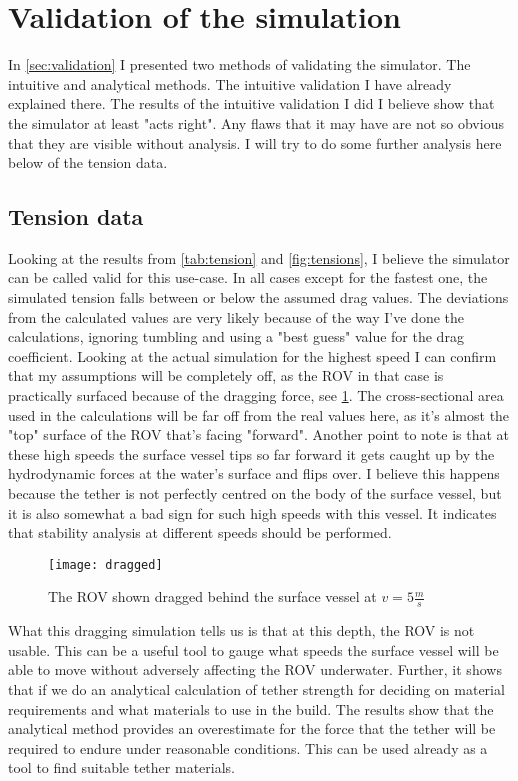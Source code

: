 \section{Validation of the simulation}
In \cref{sec:validation} I presented two methods of validating the simulator. The intuitive and analytical methods. The intuitive validation I have already explained there. The results of the intuitive validation I did I believe show that the simulator at least "acts right". Any flaws that it may have are not so obvious that they are visible without analysis. I will try to do some further analysis here below of the tension data. 

\subsection{Tension data}
Looking at the results from \cref{tab:tension} and \cref{fig:tensions}, I believe the simulator can be called valid for this use-case. In all cases except for the fastest one, the simulated tension falls between or below the assumed drag values. The deviations from the calculated values are very likely because of the way I've done the calculations, ignoring tumbling and using a "best guess" value for the drag coefficient. Looking at the actual simulation for the highest speed I can confirm that my assumptions will be completely off, as the ROV in that case is practically surfaced because of the dragging force, see \cref{fig:dragged}. The cross-sectional area used in the calculations will be far off from the real values here, as it's almost the "top" surface of the ROV that's facing "forward". Another point to note is that at these high speeds the surface vessel tips so far forward it gets caught up by the hydrodynamic forces at the water's surface and flips over. I believe this happens because the tether is not perfectly centred on the body of the surface vessel, but it is also somewhat a bad sign for such high speeds with this vessel. It indicates that stability analysis at different speeds should be performed. 

\begin{figure}
	\centering
	\texttt{[image: dragged]}
	\caption{The ROV shown dragged behind the surface vessel at \(v=5\frac{m}{s}\)}
	\label{fig:dragged}
\end{figure}

What this dragging simulation tells us is that at this depth, the ROV is not usable. This can be a useful tool to gauge what speeds the surface vessel will be able to move without adversely affecting the ROV underwater. Further, it shows that if we do an analytical calculation of tether strength for deciding on material requirements and what materials to use in the build. The results show that the analytical method provides an overestimate for the force that the tether will be required to endure under reasonable conditions. This can be used already as a tool to find suitable tether materials.

